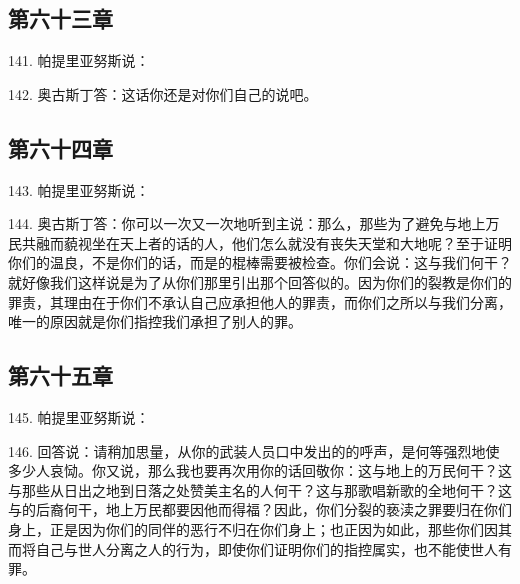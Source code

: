 
\subsection{第六十三章}

141. 帕提里亚努斯说：\par

142. 奥古斯丁答：这话你还是对你们自己的说吧。\par


\subsection{第六十四章}

143. 帕提里亚努斯说：\par

144. 奥古斯丁答：你可以一次又一次地听到主说：那么，那些为了避免与地上万民共融而藐视坐在天上者的话的人，他们怎么就没有丧失天堂和大地呢？至于证明你们的温良，不是你们的话，而是的棍棒需要被检查。你们会说：这与我们何干？就好像我们这样说是为了从你们那里引出那个回答似的。因为你们的裂教是你们的罪责，其理由在于你们不承认自己应承担他人的罪责，而你们之所以与我们分离，唯一的原因就是你们指控我们承担了别人的罪。\par


\subsection{第六十五章}

145. 帕提里亚努斯说：\par

146. 回答说：请稍加思量，从你的武装人员口中发出的的呼声，是何等强烈地使多少人哀恸。你又说，那么我也要再次用你的话回敬你：这与地上的万民何干？这与那些从日出之地到日落之处赞美主名的人何干？这与那歌唱新歌的全地何干？这与的后裔何干，地上万民都要因他而得福？因此，你们分裂的亵渎之罪要归在你们身上，正是因为你们的同伴的恶行不归在你们身上；也正因为如此，那些你们因其而将自己与世人分离之人的行为，即使你们证明你们的指控属实，也不能使世人有罪。\par

